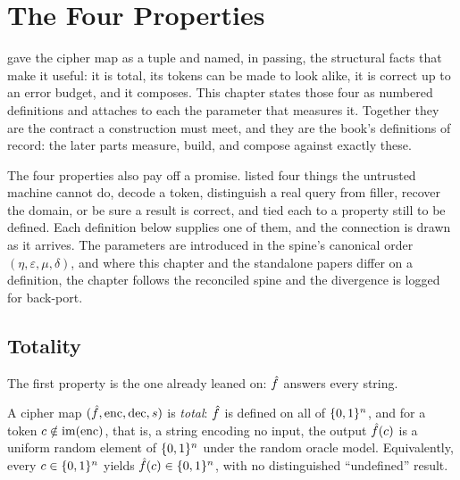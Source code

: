 
\chapter{The Four Properties}
\label{ch:four-properties}

 gave the cipher map as a tuple and named, in passing,
the structural facts that make it useful: it is total, its tokens can be
made to look alike, it is correct up to an error budget, and it composes.
This chapter states those four as numbered definitions and attaches to each
the parameter that measures it. Together they are the contract a
construction must meet, and they are the book's definitions of record: the
later parts measure, build, and compose against exactly these.

The four properties also pay off a promise. 
listed four things the untrusted machine cannot do, decode a token,
distinguish a real query from filler, recover the domain, or be sure a
result is correct, and tied each to a property still to be defined. Each
definition below supplies one of them, and the connection is drawn as it
arrives. The parameters are introduced in the spine's canonical order
$(\eta, \varepsilon, \mu, \delta)$, and where this chapter and the standalone
papers differ on a definition, the chapter follows the reconciled spine and
the divergence is logged for back-port.

\section{Totality}
\label{sec:totality-property}

The first property is the one  already leaned on:
$\hat{f}$ answers every string.

\begin{definition}
\label{def:totality}
A cipher map $(\hat{f}, \operatorname{enc}, \operatorname{dec}, s)$ is \emph{total}: $\hat{f}$ is defined on
all of $\{0,1\}^n$, and for a token $c \notin \mathrm{im}(\operatorname{enc})$, that is, a
string encoding no input, the output $\hat{f}(c)$ is a uniform random element
of $\{0,1\}^n$ under the random oracle model. Equivalently, every $c \in \{0,1\}^n$
yields $\hat{f}(c) \in \{0,1\}^n$, with no distinguished ``undefined'' result.
\end{definition}

